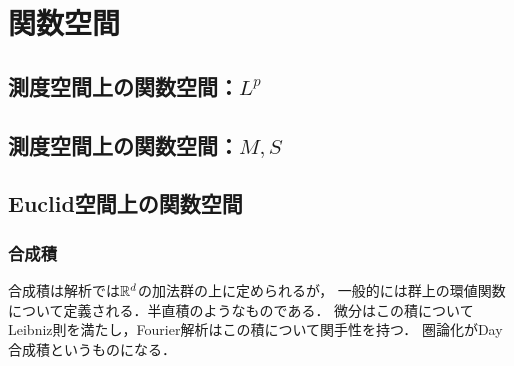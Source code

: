 \documentclass[uplatex, dvipdfmx]{jsreport}
\begin{document}
\chapter{関数空間}

\section{測度空間上の関数空間：$L^p$}

\section{測度空間上の関数空間：$M,S$}

\section{Euclid空間上の関数空間}

\subsection{合成積}

\begin{tcolorbox}[colframe=ForestGreen, colback=ForestGreen!10!white,breakable,colbacktitle=ForestGreen!40!white,coltitle=black,fonttitle=\bfseries\sffamily,
title=]
    合成積は解析では$\mathbb{R}^d$の加法群の上に定められるが，
    一般的には群上の環値関数について定義される．半直積のようなものである．
    微分はこの積についてLeibniz則を満たし，Fourier解析はこの積について関手性を持つ．
    圏論化がDay合成積というものになる．
\end{tcolorbox}
\end{document}
